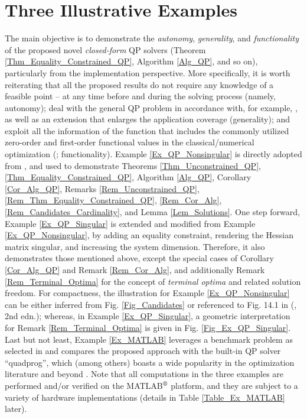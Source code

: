 \documentclass[9pt,twocolumn,twoside,lineno]{pnas-new-1}
\theoremstyle{remark}
\begin{document}
\section{Three Illustrative Examples}
\label{Sec_Ex}
The main objective is to demonstrate the \textit{autonomy}, \textit{generality}, and \textit{functionality} of the proposed novel \textit{closed-form} QP solvers (Theorem \ref{Thm_Equality_Constrained_QP}, Algorithm \ref{Alg_QP}, and so on), particularly from the implementation perspective. More specifically, it is worth reiterating that all the proposed results do not require any knowledge of a feasible point -- at any time before and during the solving process (namely, autonomy); deal with the general QP problem in accordance with, for example, \cite{Lu(Ye):03(16)}, as well as an extension that enlarges the application coverage (generality); and exploit all the information of the function that includes the commonly utilized zero-order \citep{DuJoWaWi:15} and first-order functional values in the classical/numerical optimization (\cite{NoWr:06}; functionality). Example \ref{Ex_QP_Nonsingular} is directly adopted from \cite{Lu(Ye):03(16)}, and used to demonstrate Theorems \ref{Thm_Unconstrained_QP}, \ref{Thm_Equality_Constrained_QP}, Algorithm \ref{Alg_QP}, Corollary \ref{Cor_Alg_QP}, Remarks \ref{Rem_Unconstrained_QP}, \ref{Rem_Thm_Equality_Constrained_QP}, \ref{Rem_Cor_Alg}, \ref{Rem_Candidates_Cardinality}, and Lemma \ref{Lem_Solutions}. One step forward, Example \ref{Ex_QP_Singular} is extended and modified from Example \ref{Ex_QP_Nonsingular}, by adding an equality constraint, rendering the Hessian matrix singular, and increasing the system dimension. Therefore, it also demonstrates those mentioned above, except the special cases of Corollary \ref{Cor_Alg_QP} and Remark \ref{Rem_Cor_Alg}, and additionally Remark \ref{Rem_Terminal_Optima} for the concept of \textit{terminal optima} and related solution freedom. For compactness, the illustration for Example \ref{Ex_QP_Nonsingular} can be either inferred from Fig. \ref{Fig_Candidates} or referenced to Fig. 14.1 in (\cite{Lu(Ye):03(16)}, 2nd edn.); whereas, in Example \ref{Ex_QP_Singular}, a geometric interpretation for Remark \ref{Rem_Terminal_Optima} is given in Fig. \ref{Fig_Ex_QP_Singular}. Last but not least, Example \ref{Ex_MATLAB} leverages a benchmark problem as selected in \cite{MATLAB} and compares the proposed approach with the built-in QP solver ``quadprog'', which (among others) boasts a wide popularity in the optimization literature and beyond \cite{TsMa:21}. Note that all computations in the three examples are performed and/or verified on the MATLAB$\textsuperscript{\textregistered}$ platform, and they are subject to a variety of hardware implementations (details in Table \ref{Table_Ex_MATLAB} later).
\end{document}
